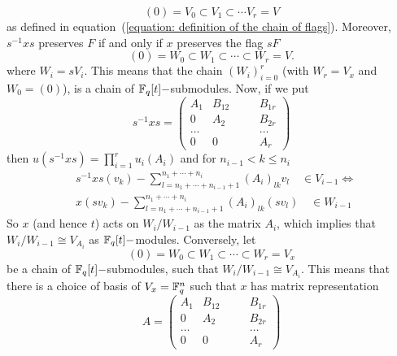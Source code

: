 \begin{equation}
    (0)=V_0\subset V_1\subset \cdots V_r= V
\end{equation}
as defined in equation~(\ref{equation: definition of the chain of flags}). Moreover, $s^{-1}xs$ preserves $F$ if and only if $x$ preserves the flag $sF$
\begin{equation}
    (0)=W_0\subset W_1\subset\cdots\subset W_r= V.
\end{equation}
where $W_i=sV_i$. This means that the chain $(W_i)_{i=0}^r$ (with $W_r=V_x$ and $W_0=(0)$), is a chain of $\mathbb{F}_q[t]-$submodules. Now, if we put
\begin{equation}
    s^{-1}xs = \left(\begin{smallmatrix}
        A_1 & B_{12}&\quad &B_{1r}\\
         0 & A_2& &B_{2r}\\
          \dots& & &\dots\\
           0 & 0& &A_r
    \end{smallmatrix}\right)
\end{equation}
then $u(s^{-1}xs)=\prod_{i=1}^ru_i(A_i)$ and for $n_{i-1}<k\leq n_i$
\begin{equation}
\begin{split}
    &s^{-1}xs(v_k)-\sum_{l=n_1+\cdots+n_{i-1}+1}^{n_1+\cdots+n_i}(A_i)_{lk}v_l \quad\in V_{i-1}\iff\\
    &x(sv_k)-\sum_{l=n_1+\cdots+n_{i-1}+1}^{n_1+\cdots+n_i}(A_i)_{lk}(sv_l) \quad\in W_{i-1}
\end{split}
\end{equation}
So $x$ (and hence $t$) acts on $W_i/W_{i-1}$ as the matrix $A_i$, which implies that $W_i/W_{i-1}\cong V_{A_i}$ as $\mathbb{F}_q[t]-$modules. Conversely, let 
\begin{equation}
     (0)=W_0\subset W_1\subset\cdots\subset W_r= V_x
\end{equation}
be a chain of $\mathbb{F}_q[t]-$submodules, such that $W_i/W_{i-1}\cong V_{A_i}$. This means that there is a choice of basis of $V_x=\mathbb{F}_q^n$ such that $x$ has matrix representation
\begin{equation}
    A=\left(\begin{smallmatrix}
        A_1 & B_{12}&\quad &B_{1r}\\
         0 & A_2& &B_{2r}\\
          \dots& & &\dots\\
           0 & 0& &A_r
    \end{smallmatrix}\right)
\end{equation}
